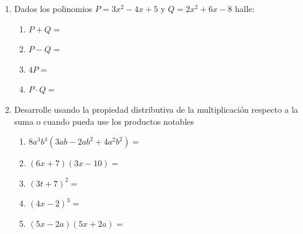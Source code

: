 \documentclass[letterpaper,fleqn]{article}
\begin{document}
\begin{enumerate}
\begin{enumerate}
\end{enumerate}
\newpage
\item Dados los polinomios $P=3x^{2}-4x+5$ \hspace{24pt} y \hspace{24pt} $Q=2x^{2}+6x-8$ halle:
\begin{enumerate}
 \item $P+Q=$\noanswer
 \item $P-Q=$\noanswer
 \item $4P=$\noanswer
 \item $P\cdot Q=$\noanswer
\end{enumerate}
\item Desarrolle usando la propiedad distributiva de la multiplicación respecto a la suma o cuando pueda use los productos notables
\begin{enumerate}
 \item $8a^{3}b^{4}(3ab-2ab^{2}+4a^{2}b^{2})=$\noanswer
 \item $(6x+7)(3x-10)=$\noanswer
 \item $(3t+7)^{2}=$\noanswer
 \item $(4x-2)^{3}=$\noanswer
 \item $(5x-2a)(5x+2a)=$\noanswer
\end{enumerate}
 \end{enumerate}
\end{document}
